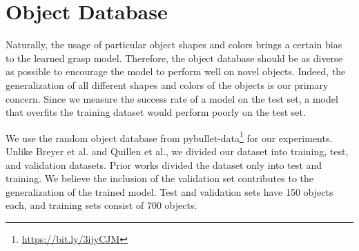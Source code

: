 \section{Object Database}

Naturally, the usage of particular object shapes and colors brings a certain bias to the learned grasp model. Therefore, the object database should be as diverse as possible to encourage the model to perform well on novel objects. Indeed, the generalization of all different shapes and colors of the objects is our primary concern. Since we measure the success rate of a model on the test set, a model that overfits the training dataset would perform poorly on the test set.

We use the random object database from pybullet-data\footnote{\url{https://bit.ly/3ijyCJM}} for our experiments. Unlike Breyer et al. and Quillen et al., we divided our dataset into training, test, and validation datasets. Prior works divided the dataset only into test and training. We believe the inclusion of the validation set contributes to the generalization of the trained model. Test and validation sets have 150 objects each, and training sets consist of 700 objects. 